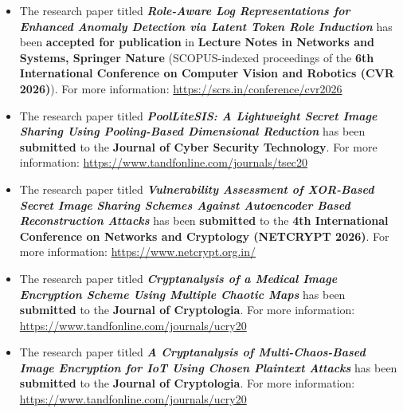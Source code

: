 \begin{center}
    \justifying
\end{center}

\vspace{0.5em}
\begin{itemize}

    \item The research paper titled \textit{\textbf{Role-Aware Log Representations for Enhanced Anomaly Detection via Latent Token Role Induction}} has been \textbf{accepted for publication} in \textbf{Lecture Notes in Networks and Systems, Springer Nature} (SCOPUS-indexed proceedings of the \textbf{6th International Conference on Computer Vision and Robotics (CVR 2026)}).  
    For more information: \url{https://scrs.in/conference/cvr2026}

    \item The research paper titled \textit{\textbf{PoolLiteSIS: A Lightweight Secret Image Sharing Using Pooling-Based Dimensional Reduction}} has been \textbf{submitted} to the \textbf{Journal of Cyber Security Technology}.  
    For more information: \url{https://www.tandfonline.com/journals/tsec20}

    \item The research paper titled \textit{\textbf{Vulnerability Assessment of XOR-Based Secret Image Sharing Schemes Against Autoencoder Based Reconstruction Attacks}} has been \textbf{submitted} to the \textbf{4th International Conference on Networks and Cryptology (NETCRYPT 2026)}.  
    For more information: \url{https://www.netcrypt.org.in/}

    \item The research paper titled \textit{\textbf{Cryptanalysis of a Medical Image Encryption Scheme Using Multiple Chaotic Maps}} has been \textbf{submitted} to the \textbf{Journal of Cryptologia}.  
    For more information: \url{https://www.tandfonline.com/journals/ucry20}

    \item The research paper titled \textit{\textbf{A Cryptanalysis of Multi-Chaos-Based Image Encryption for IoT Using Chosen Plaintext Attacks}} has been \textbf{submitted} to the \textbf{Journal of Cryptologia}.  
    For more information: \url{https://www.tandfonline.com/journals/ucry20}

\end{itemize}